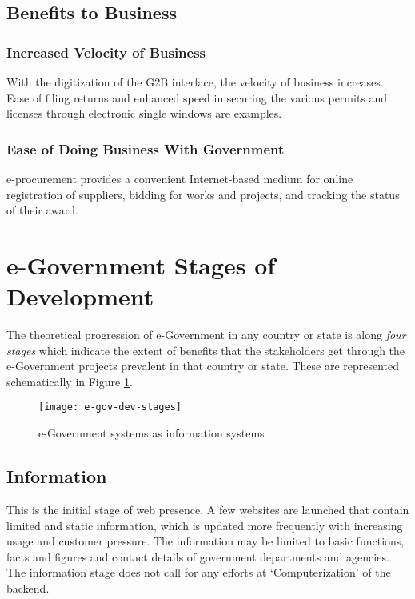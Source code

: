 \subsection{Benefits to Business}
\subsubsection{Increased Velocity of Business}
With the digitization of the G2B interface, the velocity of business increases. Ease of filing returns and enhanced speed in securing the various permits and licenses through electronic single windows are examples.

\subsubsection{Ease of Doing Business With Government}
e-procurement provides a convenient Internet-based medium for online registration of suppliers, bidding for works and projects, and tracking the status of their award.


\section{e-Government Stages of Development}
The theoretical progression of e-Government in any country or state is along \textit{four stages} which indicate the extent of benefits that the stakeholders get through the e-Government projects prevalent in that country or state. These are represented schematically in Figure {\ref{fig:e-gov-dev-stages}}.


\begin{figure}[ht]
	\centering
	\texttt{[image: e-gov-dev-stages]}
	\caption{e-Government systems as information systems}
	\label{fig:e-gov-dev-stages}
\end{figure}

\subsection{Information}
This is the initial stage of web presence. A few websites are launched that contain limited and static information, which is updated more frequently with increasing usage and customer pressure. The information may be limited to basic functions, facts and figures and contact details of government departments and agencies. The information stage does not call for any efforts at `Computerization’ of the backend.

